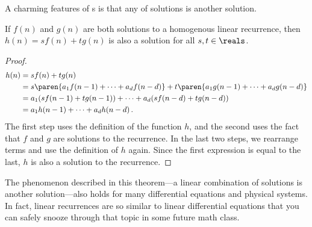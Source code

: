 A charming features of s is that any
 of solutions is another solution.

\begin{theorem}
\label{th:recur-linearity}
  If $f(n)$ and $g(n)$ are both solutions to a homogenous linear
  recurrence, then $h(n) = s f(n) + t g(n)$ is also a solution for all
  $s, t \in \reals$.
\end{theorem}
\begin{proof}
\begin{align*}
h(n) & = sf(n) + tg(n) \\
& = s \paren{a_1 f(n-1) + \cdots + a_d f(n - d)} +
    t \paren{a_1 g(n-1) + \cdots + a_d g(n - d)} \\
& = a_1 (s f(n-1) + t g(n-1)) + \cdots + a_d (s f(n-d) + t g(n-d)) \\
& = a_1 h(n-1) + \cdots + a_d h(n-d)\, .
\end{align*}
The first step uses the definition of the function $h$, and the second
uses the fact that $f$ and $g$ are solutions to the recurrence.  In
the last two steps, we rearrange terms and use the definition of $h$
again.  Since the first expression is equal to the last, $h$ is also a
solution to the recurrence.
\end{proof}

The phenomenon described in this theorem---a linear combination of
solutions is another solution---also holds for many differential
equations and physical systems.  In fact, linear recurrences are so
similar to linear differential equations that you can safely snooze
through that topic in some future math class.

